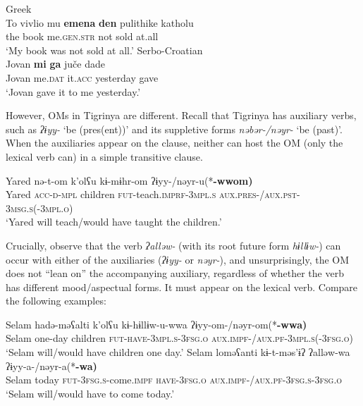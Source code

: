 \documentclass[output=paper]{langscibook}
\begin{document}
\ea\label{ex:Gebregziabher:adv} 
\ea Greek \citep[532]{giustiandstavrou08} \\
\gll To vivlio mu {\textbf{emena}} {\textbf{den}} pulithike katholu \\
the book me.{\scshape gen.str} not sold at.all\\
\glt `My book was not sold at all.'
\ex Serbo-Croatian \citep[75]{bovskovic04} \\
\gll Jovan {\textbf{mi}} {\textbf{ga}} ju\v ce dade \\
Jovan me.{\scshape dat} it.{\scshape acc} yesterday gave\\
\glt `Jovan gave it to me yesterday.'
\z
\z

\noindent However, OMs in Tigrinya are different. Recall that Tigrinya has auxiliary verbs, such as \emph{ʔɨyy-} `be (pres(ent))' and its suppletive forms \emph{nəbər-/nəyr-} `be (past)'. When the auxiliaries appear on the clause, neither can host the OM (only the lexical verb can) in a simple transitive clause.

\ea 
\gll Yared nə-t-om k'olʕu kɨ-mɨhr-om ʔɨyy-/nəyr-u(*\textbf{-wwom)} \\
Yared {\scshape acc-d-mpl} children {\scshape fut-}teach.{\scshape imprf-3mpl.s} {\scshape aux.pres-/aux.pst-3msg.s(-3mpl.o)}\\
\glt `Yared will teach/would have taught the children.'
\z
 

\noindent Crucially, observe that the verb \emph{ʔalləw-} (with its root future form \emph{hɨllɨw-}) can occur with either of the auxiliaries (\emph{ʔɨyy-} or \emph{nəyr-}), and unsurprisingly, the OM does not ``lean on''  the accompanying auxiliary, regardless of whether the verb has different mood/aspectual forms. It must appear on the lexical verb. Compare the following examples: 


\ea\label{ex:Gebregziabher:be1} 
\gll Selam hadə-məʕalti k'olʕu kɨ-hɨllɨw-u-wwa ʔɨyy-om-/nəyr-om(*\textbf{-wwa)} \\
Selam one-day children {\scshape fut-have-3mpl.s-3fsg.o} {\scshape aux.impf-/aux.pf-3mpl.s(-3fsg.o)}\\
\glt `Selam will/would have children one day.'
\ex\label{ex:Gebregziabher:be2}
\gll Selam loməʕanti kɨ-t-məs'ɨʔ ʔalləw-wa ʔɨyy-a-/nəyr-a(*\textbf{-wa)} \\
Selam today {\scshape fut-3fsg.s-}come.{\scshape impf} {\scshape have-3fsg.o} {\scshape aux.impf-/aux.pf-3fsg.s-3fsg.o} \\
\glt `Selam will/would have to come today.'
\z
\end{document}
